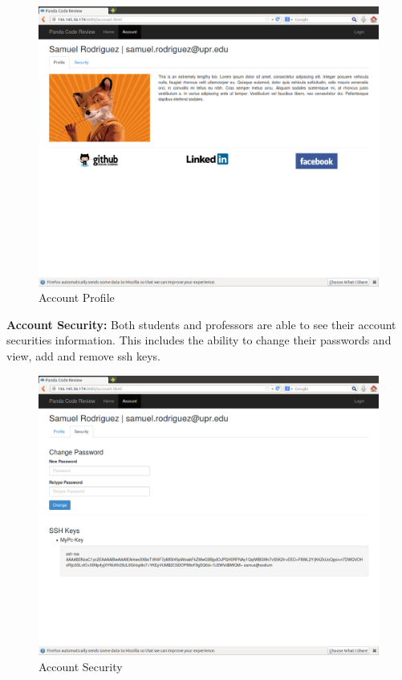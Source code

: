 \begin{figure}[H]
	\centering
	\includegraphics[width=\textwidth]{img/account-profile}
	\caption{Account Profile}
\end{figure}

\textbf{Account Security:} Both students and professors are able to
see their account securities information. This includes the ability to
change their passwords and view, add and remove ssh keys.

\begin{figure}[H]
	\centering
	\includegraphics[width=\textwidth]{img/account-secutiry}
	\caption{Account Security}
\end{figure}